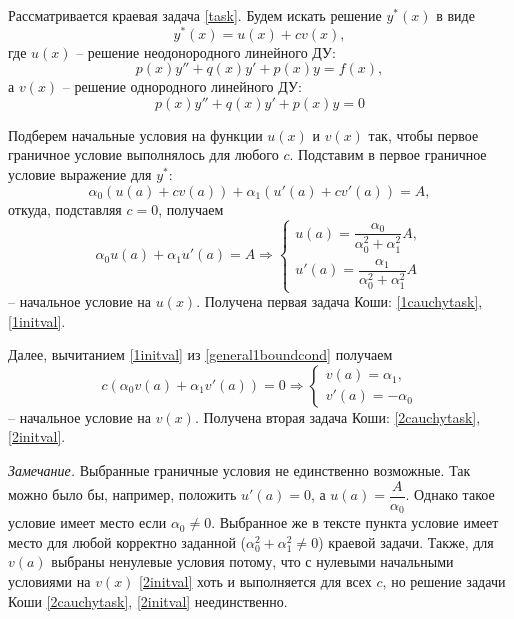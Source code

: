 \documentclass[a4paper, 12pt]{article}
\begin{document}
	Рассматривается краевая задача \eqref{task}. Будем искать решение $y^*(x)$ в виде 
	\begin{equation}
		y^*(x)=u(x)+cv(x),
	\end{equation}
	где $u(x)$ -- решение неодонородного линейного ДУ:
	\begin{equation} \label{1cauchytask}
		p(x)y''+q(x)y'+p(x)y=f(x),
	\end{equation}
	а $v(x)$ -- решение однородного линейного ДУ:
	\begin{equation} \label{2cauchytask}
		p(x)y''+q(x)y'+p(x)y=0
	\end{equation}
	
	Подберем начальные условия на функции $u(x)$ и $v(x)$ так, чтобы первое граничное условие выполнялось для любого $c$. Подставим в первое граничное условие выражение для $y^*$:
	\begin{equation} \label{general1boundcond}
		\alpha_0(u(a)+cv(a))+\alpha_1(u'(a)+cv'(a))=A,
	\end{equation}
	откуда, подставляя $c=0$, получаем
	\begin{equation} \label{1initval}
		\alpha_0u(a)+\alpha_1u'(a)=A \Rightarrow
		\begin{cases}
			u(a) = \dfrac{\alpha_0}{\alpha_0^2+\alpha_1^2}A,\\
			u'(a) = \dfrac{\alpha_1}{\alpha_0^2+\alpha_1^2}A
		\end{cases}
	\end{equation}
	-- начальное условие на $u(x)$. Получена первая задача Коши: \eqref{1cauchytask}, \eqref{1initval}.
	
	Далее, вычитанием \eqref{1initval} из \eqref{general1boundcond} получаем
	\begin{equation} \label{2initval}
		c(\alpha_0v(a)+\alpha_1v'(a))=0 \Rightarrow
		\begin{cases}
			v(a) = \alpha_1,\\
			v'(a) = -\alpha_0
		\end{cases}
	\end{equation}
	-- начальное условие на $v(x)$. Получена вторая задача Коши: \eqref{2cauchytask}, \eqref{2initval}.
	
	\textit{Замечание.} Выбранные граничные условия не единственно возможные. Так можно было бы, например, положить $u'(a)=0$, а $u(a)=\dfrac{A}{\alpha_0}$. Однако такое условие имеет место если $\alpha_0\neq0$. Выбранное же в тексте пункта условие имеет место для любой корректно заданной ($\alpha_0^2+\alpha_1^2\neq0$) краевой задачи. Также, для $v(a)$ выбраны ненулевые условия потому, что с нулевыми начальными условиями на $v(x)$ \eqref{2initval} хоть и выполняется для всех $c$, но решение задачи Коши \eqref{2cauchytask}, \eqref{2initval} неединственно.
	
\end{document}
